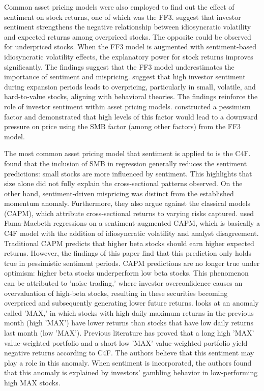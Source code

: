 Common asset pricing models were also employed to find out the effect of sentiment on stock returns, one of which was the FF3.  suggest that investor sentiment strengthens the negative relationship between idiosyncratic volatility and expected returns among overpriced stocks. The opposite could be observed for underpriced stocks. When the FF3 model is augmented with sentiment-based idiosyncratic volatility effects, the explanatory power for stock returns improves significantly. The findings suggest that the FF3 model underestimates the importance of sentiment and mispricing.  suggest that high investor sentiment during expansion periods leads to overpricing, particularly in small, volatile, and hard-to-value stocks, aligning with behavioral theories. The findings reinforce the role of investor sentiment within asset pricing models.  constructed a pessimism factor and demonstrated that high levels of this factor would lead to a downward pressure on price using the SMB factor (among other factors) from the FF3 model.


The most common asset pricing model that sentiment is applied to is the C4F.  found that the inclusion of SMB in regression generally reduces the sentiment predictions: small stocks are more influenced by sentiment. This highlights that size alone did not fully explain the cross-sectional patterns observed. On the other hand, sentiment-driven mispricing was distinct from the established momentum anomaly. Furthermore, they also argue against the classical models (CAPM), which attribute cross-sectional returns to varying risks captured.  used Fama-Macbeth regressions on a sentiment-augmented CAPM, which is basically a C4F model with the addition of idiosyncratic volatility and analyst disagreement. Traditional CAPM predicts that higher beta stocks should earn higher expected returns. However, the findings of this paper find that this prediction only holds true in pessimistic sentiment periods. CAPM predictions are no longer true under optimism: higher beta stocks underperform low beta stocks. This phenomenon can be attributed to 'noise trading,' where investor overconfidence causes an overvaluation of high-beta stocks, resulting in these securities becoming overpriced and subsequently generating lower future returns.  looks at an anomaly called 'MAX,' in which stocks with high daily maximum returns in the previous month (high 'MAX') have lower returns than stocks that have low daily returns last month (low 'MAX'). Previous literature has proved that a long high 'MAX' value-weighted portfolio and a short low 'MAX' value-weighted portfolio yield negative returns according to C4F. The authors believe that this sentiment may play a role in this anomaly. When sentiment is incorporated, the authors found that this anomaly is explained by investors' gambling behavior in low-performing high MAX stocks.



